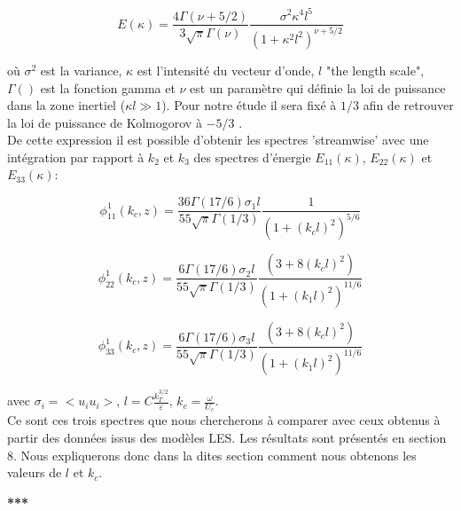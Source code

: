 \documentclass[12pt]{article}   %
\theoremstyle{plain}
\theoremstyle{remark}
\begin{document}
	\begin{equation}
		E(\kappa) = \frac{4\Gamma(\nu + 5/2)}{3\sqrt{\pi}\Gamma(\nu)}\frac{\sigma^2\kappa^4l^5}{(1+\kappa^2l^2)^{\nu + 5/2}}
		\label{energie_spectra_2}
	\end{equation}

	où $\sigma^2$ est la variance, $\kappa$ est l'intensité du vecteur d'onde, $l$ "the length scale", $\Gamma()$ est la fonction gamma et $\nu$ est un paramètre qui définie la loi de puissance dans la zone inertiel ($\kappa l \gg 1$). Pour notre étude il sera fixé à $1/3$ afin de retrouver la loi de puissance de Kolmogorov à $-5/3$ \cite{kolmogorov1991local}. \\

	De cette expression il est possible d'obtenir les spectres 'streamwise' avec une intégration par rapport à $k_2$ et $k_3$ des spectres d'énergie $E_{11}(\kappa)$, $E_{22}(\kappa)$ et $E_{33}(\kappa)$:
	
	\begin{equation}
		\phi_{11}^1(k_c,z) = \frac{36\Gamma(17/6)\sigma_1l}{55\sqrt{\pi}\Gamma(1/3)}\frac{1}{(1 + (k_cl)^2)^{5/6}}
		\label{eq:phi_vk_1}
	\end{equation}

	\begin{equation}
		\phi_{22}^1(k_c,z) = \frac{6\Gamma(17/6)\sigma_2l}{55\sqrt{\pi}\Gamma(1/3)}\frac{(3+8(k_cl)^2)}{(1 + (k_1l)^2)^{11/6}}
		\label{eq:phi_vk_2}
	\end{equation}

	\begin{equation}
		\phi_{33}^1(k_c,z) = \frac{6\Gamma(17/6)\sigma_3l}{55\sqrt{\pi}\Gamma(1/3)}\frac{(3+8(k_cl)^2)}{(1 + (k_1l)^2)^{11/6}}
		\label{eq:phi_vk_3}
	\end{equation}

	avec $\sigma_i = <u_iu_i>$, $l=C\frac{k_T^{3/2}}{\varepsilon}$, $k_c = \frac{\omega}{U_c}$.\\
	
	Ce sont ces trois spectres que nous chercherons à comparer avec ceux obtenus à partir des données issus des modèles LES. Les résultats sont présentés en section $8$. Nous expliquerons donc dans la dites section comment nous obtenons les valeurs de $l$ et $k_c$.
	
	
		 
\begin{center}
	\large \bf{***}
\end{center}

\vspace{0.3cm}	
\end{document}
